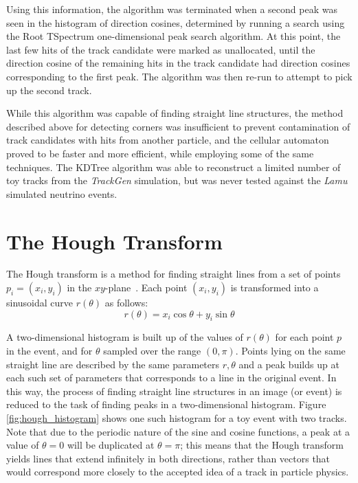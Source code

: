 Using this information, the algorithm was terminated when a second peak was seen in the histogram of direction cosines, determined by running a search using the {\sc Root} TSpectrum one-dimensional peak search algorithm. At this point, the last few hits of the track candidate were marked as unallocated, until the direction cosine of the remaining hits in the track candidate had direction cosines corresponding to the first peak. The algorithm was then re-run to attempt to pick up the second track.

While this algorithm was capable of finding straight line structures, the method described above for detecting corners was insufficient to prevent contamination of track candidates with hits from another particle, and the cellular automaton proved to be faster and more efficient, while employing some of the same techniques. The KDTree algorithm was able to reconstruct a limited number of toy tracks from the \emph{TrackGen} simulation, but was never tested against the \emph{Lamu} simulated neutrino events.

\section{The Hough Transform}\label{sec:hough_transform}
The Hough transform is a method for finding straight lines from a set of points $p_i = (x_i, y_i)$ in the $xy$-plane~\citep{Hough1959}. Each point $(x_i, y_i)$ is transformed into a sinusoidal curve $r(\theta)$ as follows:
\begin{equation}
    r(\theta) = x_i \cos \theta + y_i \sin \theta
\end{equation}

A two-dimensional histogram is built up of the values of $r(\theta)$ for each point $p$ in the event, and for $\theta$ sampled over the range $(0,\pi)$. Points lying on the same straight line are described by the same parameters $r,\theta$ and a peak builds up at each such set of parameters that corresponds to a line in the original event. In this way, the process of finding straight line structures in an image (or event) is reduced to the task of finding peaks in a two-dimensional histogram. Figure \ref{fig:hough_histogram} shows one such histogram for a toy event with two tracks. Note that due to the periodic nature of the sine and cosine functions, a peak at a value of $\theta=0$ will be duplicated at $\theta=\pi$; this means that the Hough transform yields lines that extend infinitely in both directions, rather than vectors that would correspond more closely to the accepted idea of a track in particle physics.

